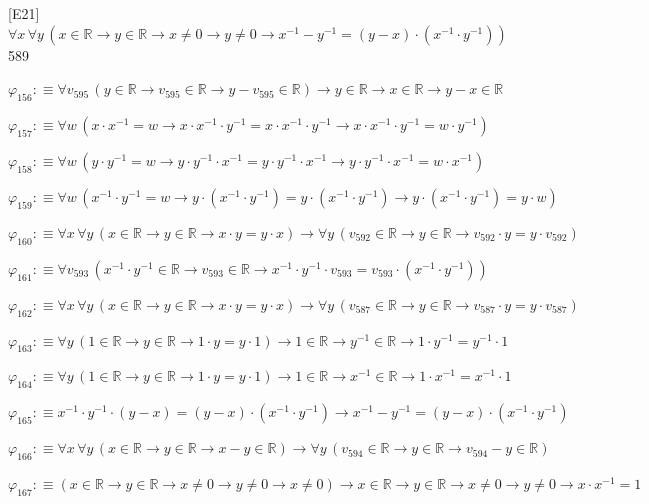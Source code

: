 \begin{fullproof}{[E21]}{$\forall x\,\forall y\,(x \in \mathbb{R} \to y \in \mathbb{R} \to x \neq 0 \to y \neq 0 \to x^{-1} - y^{-1} = (y - x) \cdot (x^{-1} \cdot y^{-1}))$}{589}
\begin{abbrevlist}
\item $\varphi_{156} :\equiv \forall v_{595}\,(y \in \mathbb{R} \to v_{595} \in \mathbb{R} \to y - v_{595} \in \mathbb{R}) \to y \in \mathbb{R} \to x \in \mathbb{R} \to y - x \in \mathbb{R}$
\item $\varphi_{157} :\equiv \forall w\,(x \cdot x^{-1} = w \to x \cdot x^{-1} \cdot y^{-1} = x \cdot x^{-1} \cdot y^{-1} \to x \cdot x^{-1} \cdot y^{-1} = w \cdot y^{-1})$
\item $\varphi_{158} :\equiv \forall w\,(y \cdot y^{-1} = w \to y \cdot y^{-1} \cdot x^{-1} = y \cdot y^{-1} \cdot x^{-1} \to y \cdot y^{-1} \cdot x^{-1} = w \cdot x^{-1})$
\item $\varphi_{159} :\equiv \forall w\,(x^{-1} \cdot y^{-1} = w \to y \cdot (x^{-1} \cdot y^{-1}) = y \cdot (x^{-1} \cdot y^{-1}) \to y \cdot (x^{-1} \cdot y^{-1}) = y \cdot w)$
\item $\varphi_{160} :\equiv \forall x\,\forall y\,(x \in \mathbb{R} \to y \in \mathbb{R} \to x \cdot y = y \cdot x) \to \forall y\,(v_{592} \in \mathbb{R} \to y \in \mathbb{R} \to v_{592} \cdot y = y \cdot v_{592})$
\item $\varphi_{161} :\equiv \forall v_{593}\,(x^{-1} \cdot y^{-1} \in \mathbb{R} \to v_{593} \in \mathbb{R} \to x^{-1} \cdot y^{-1} \cdot v_{593} = v_{593} \cdot (x^{-1} \cdot y^{-1}))$
\item $\varphi_{162} :\equiv \forall x\,\forall y\,(x \in \mathbb{R} \to y \in \mathbb{R} \to x \cdot y = y \cdot x) \to \forall y\,(v_{587} \in \mathbb{R} \to y \in \mathbb{R} \to v_{587} \cdot y = y \cdot v_{587})$
\item $\varphi_{163} :\equiv \forall y\,(1 \in \mathbb{R} \to y \in \mathbb{R} \to 1 \cdot y = y \cdot 1) \to 1 \in \mathbb{R} \to y^{-1} \in \mathbb{R} \to 1 \cdot y^{-1} = y^{-1} \cdot 1$
\item $\varphi_{164} :\equiv \forall y\,(1 \in \mathbb{R} \to y \in \mathbb{R} \to 1 \cdot y = y \cdot 1) \to 1 \in \mathbb{R} \to x^{-1} \in \mathbb{R} \to 1 \cdot x^{-1} = x^{-1} \cdot 1$
\item $\varphi_{165} :\equiv x^{-1} \cdot y^{-1} \cdot (y - x) = (y - x) \cdot (x^{-1} \cdot y^{-1}) \to x^{-1} - y^{-1} = (y - x) \cdot (x^{-1} \cdot y^{-1})$
\item $\varphi_{166} :\equiv \forall x\,\forall y\,(x \in \mathbb{R} \to y \in \mathbb{R} \to x - y \in \mathbb{R}) \to \forall y\,(v_{594} \in \mathbb{R} \to y \in \mathbb{R} \to v_{594} - y \in \mathbb{R})$
\item $\varphi_{167} :\equiv (x \in \mathbb{R} \to y \in \mathbb{R} \to x \neq 0 \to y \neq 0 \to x \neq 0) \to x \in \mathbb{R} \to y \in \mathbb{R} \to x \neq 0 \to y \neq 0 \to x \cdot x^{-1} = 1$

\end{abbrevlist}
\end{fullproof}
